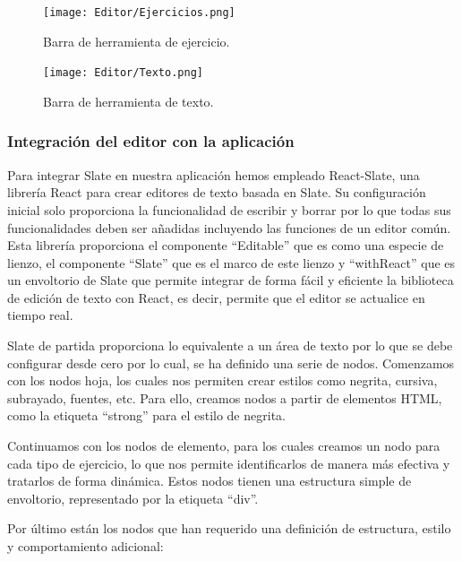 \begin{figure}[h!]
  \centering
  \texttt{[image: Editor/Ejercicios.png]}
  \caption{Barra de herramienta de ejercicio.}
  \label{fig:barrraHerramientaEjercicios}
\end{figure}

\begin{figure}[h!]
  \centering
  \texttt{[image: Editor/Texto.png]}
  \caption{Barra de herramienta de texto.}
  \label{fig:barrraHerramientaTexto}
\end{figure}

\subsubsection{Integración del editor con la aplicación}
Para integrar Slate en nuestra aplicación hemos empleado React-Slate, una librería React para crear editores de texto basada en Slate. Su configuración inicial solo proporciona la funcionalidad de escribir y borrar por lo que todas sus funcionalidades deben ser añadidas incluyendo las funciones de un editor común. Esta librería proporciona el componente ``Editable'' que es como una especie de lienzo,  el componente ``Slate'' que es el marco de este lienzo y ``withReact'' que es un envoltorio de Slate que permite integrar de forma fácil y eficiente la biblioteca de edición de texto con React, es decir, permite que el editor se actualice en tiempo real.

Slate de partida proporciona lo equivalente a un área de texto por lo que se debe configurar desde cero por lo cual, se ha definido una serie de nodos. Comenzamos con los nodos hoja, los cuales nos permiten crear estilos como negrita, cursiva, subrayado, fuentes, etc. Para ello, creamos nodos a partir de elementos HTML, como la etiqueta ``strong'' para el estilo de negrita.

Continuamos con los nodos de elemento, para los cuales creamos un nodo para cada tipo de ejercicio, lo que nos permite identificarlos de manera más efectiva y tratarlos de forma dinámica. Estos nodos tienen una estructura simple de envoltorio, representado por la etiqueta ``div''.

Por último están los nodos que han requerido una definición de estructura, estilo y comportamiento adicional:

